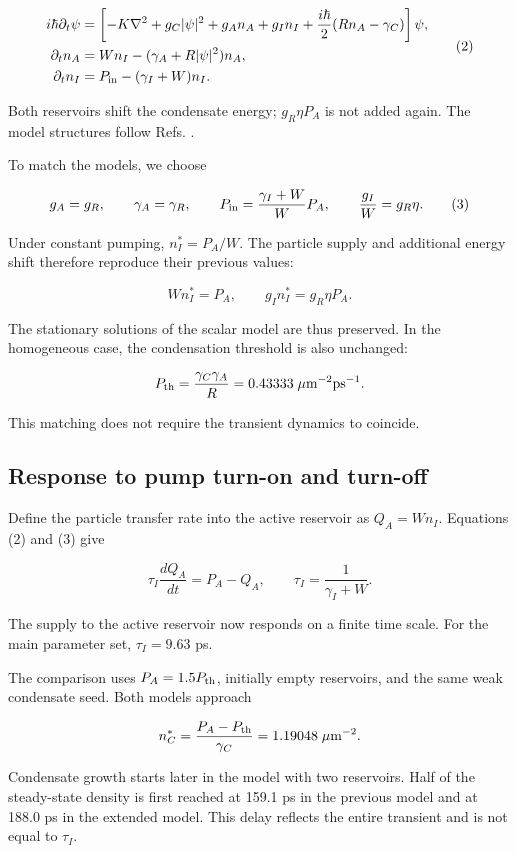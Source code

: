 \documentclass[12pt,a4paper]{article}
\begin{document}
\[
\begin{aligned}
i\hbar\partial_t\psi&=\left[-K\nabla^2+g_C|\psi|^2+g_A n_A+g_I n_I
+\frac{i\hbar}{2}(Rn_A-\gamma_C)\right]\psi,\\
\partial_t n_A&=Wn_I-(\gamma_A+R|\psi|^2)n_A,\\
\partial_t n_I&=P_{\rm in}-(\gamma_I+W)n_I.
\end{aligned}
\tag{2}\label{eq:2}
\]

Both reservoirs shift the condensate energy; \(g_R\eta P_A\) is not added again. The model structures follow Refs. \cite{ref1,ref2}.

To match the models, we choose

\[
g_A=g_R,\qquad \gamma_A=\gamma_R,\qquad
P_{\rm in}=\frac{\gamma_I+W}{W}P_A,\qquad
\frac{g_I}{W}=g_R\eta.
\tag{3}\label{eq:3}
\]

Under constant pumping, \(n_I^*=P_A/W\). The particle supply and additional energy shift therefore reproduce their previous values:

\[
Wn_I^*=P_A,\qquad g_I n_I^*=g_R\eta P_A.
\]

The stationary solutions of the scalar model are thus preserved. In the homogeneous case, the condensation threshold is also unchanged:

\[
P_{\rm th}=\frac{\gamma_C\gamma_A}{R}
=0.43333\;\mu\mathrm m^{-2}\mathrm{ps}^{-1}.
\]

This matching does not require the transient dynamics to coincide.

\subsection{Response to pump turn-on and turn-off}

Define the particle transfer rate into the active reservoir as \(Q_A=Wn_I\). Equations (2) and (3) give

\[
\tau_I\frac{dQ_A}{dt}=P_A-Q_A,
\qquad \tau_I=\frac{1}{\gamma_I+W}.
\tag{4}\label{eq:4}
\]

The supply to the active reservoir now responds on a finite time scale. For the main parameter set, \(\tau_I=9.63\) ps.

The comparison uses \(P_A=1.5P_{\rm th}\), initially empty reservoirs, and the same weak condensate seed. Both models approach

\[
n_C^*=\frac{P_A-P_{\rm th}}{\gamma_C}
=1.19048\;\mu\mathrm m^{-2}.
\]

Condensate growth starts later in the model with two reservoirs. Half of the steady-state density is first reached at 159.1 ps in the previous model and at 188.0 ps in the extended model. This delay reflects the entire transient and is not equal to \(\tau_I\).
\end{document}
